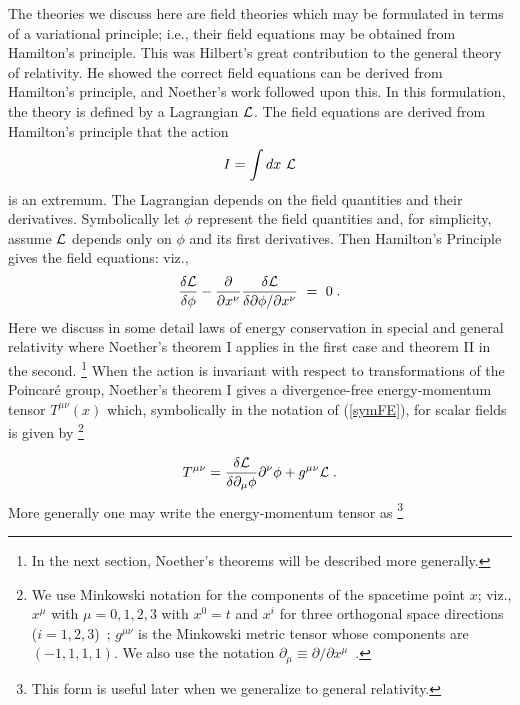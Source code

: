 \documentclass[12pt]{article}
\begin{document}
The theories we discuss here  are field theories which may be formulated in
terms of a variational principle; i.e., their field 
 equations may be obtained from Hamilton's principle.
This was Hilbert's great contribution to the general theory of relativity. He showed the correct field equations can be derived from  Hamilton's 
principle, and   Noether's work followed upon this. 
In this formulation, the theory is defined by a Lagrangian $\cal{L}$. The
field equations are derived from Hamilton's principle that the action
\begin{equation} 
I = \int dx ~\cal{L} \label{act}
\end{equation}
is an extremum. The Lagrangian depends on the field quantities and their
derivatives. Symbolically let $\phi$ represent the field quantities and,
for simplicity,
 assume $\cal{L}$ depends only on $\phi$ and its first derivatives.
Then Hamilton's Principle gives 
 the field equations: viz.,  
 \begin{equation} {\delta {\cal{L}}
\over \delta \phi} - {\partial \over \partial x^\nu}{\delta{\cal{L}} \over
\delta\partial \phi/\partial x^\nu } ~ = ~ 0 \; .  \label{symFE} 
\end{equation}
Here we discuss in some detail laws of energy
conservation in special and general relativity where Noether's theorem I
applies in the first case and theorem II in the second. \footnote{
 In the next section, Noether's
theorems  will be described more generally.}
 When the action is invariant with respect to 
transformations of the Poincar\'{e} 
group,   Noether's theorem I gives a divergence-free
 energy-momentum  tensor $T^{\mu\nu}(x)$ which, symbolically in the notation of 
  (\ref{symFE}), for scalar fields is given by 
\footnote{ We use Minkowski notation for the components
of the spacetime point $x$; viz., $x^\mu$ with $\mu = 0, 1, 2, 3$ with $x^0 = t$
and $x^i$ for three orthogonal space directions ($ i = 1, 2, 3$)~;
 $g^{\mu\nu}$ is the Minkowski metric tensor whose components are 
$(-1, 1, 1, 1)$. We also use the notation $\partial_{\mu} \equiv \partial / 
\partial x^\mu $~.} 

\begin{equation}
T^{\mu\nu} = {\delta {\cal{L}}\over \delta \partial_{\mu} \phi} \partial^\nu 
\phi + g^{\mu\nu} {\cal{L}}\; .  \label{Tmunu} 
\end{equation}
More generally one may write the energy-momentum tensor as
\footnote{This form is useful  later when we generalize to general relativity.}
\end{document}
